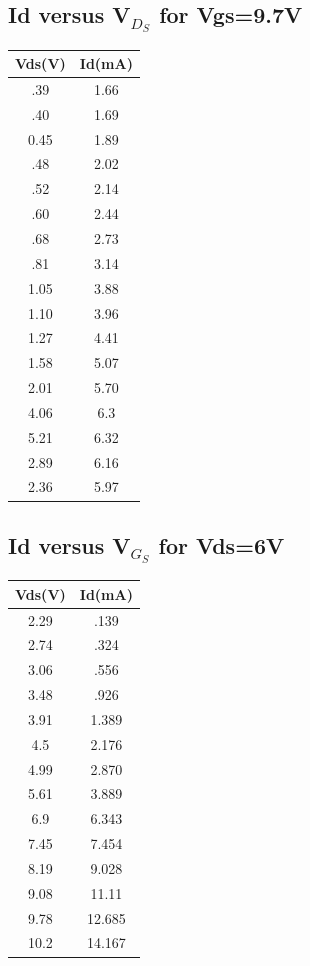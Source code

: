 \documentclass[12pt]{article}
\begin{document}
\subsection{Id versus V$_D_S$ for Vgs=9.7V}
\begin{center}
 \begin{tabular}{|| c | c||} 
 \hline
 Vds(V) & Id(mA) \\ [0.5ex] 
 \hline\hline
 .39&1.66\\
 \hline
 .40&1.69\\
 \hline
 0.45&1.89\\
 \hline
 .48&2.02\\
 \hline
 .52&2.14\\
 \hline
 .60&2.44\\
 \hline
 .68&2.73\\
 \hline
 .81&3.14\\
 \hline
 1.05&3.88\\
 \hline
 1.10&3.96\\
 \hline
 1.27&4.41\\
 \hline
 1.58&5.07\\
 \hline
 2.01&5.70\\
 \hline
 4.06&6.3\\
 \hline
 5.21&6.32\\
 \hline
 2.89&6.16\\
 \hline
 2.36&5.97\\
 \hline
\end{tabular}
\end{center}

\subsection{Id versus V$_G_S$ for Vds=6V}
\begin{center}
 \begin{tabular}{|| c | c||} 
 \hline
 Vds(V) & Id(mA) \\ [0.5ex] 
 \hline\hline
 2.29&.139\\
 \hline
 2.74&.324\\
 \hline
 3.06&.556\\
 \hline
 3.48&.926\\
 \hline
 3.91&1.389\\
 \hline
 4.5&2.176\\
 \hline
 4.99&2.870\\
 \hline
 5.61&3.889\\
 \hline
 6.9&6.343\\
 \hline
 7.45&7.454\\
 \hline
 8.19&9.028\\
 \hline
 9.08&11.11\\
 \hline
 9.78&12.685\\
 \hline
 10.2&14.167\\
 \hline
 


\end{tabular}
\end{center}
 
\end{document}
